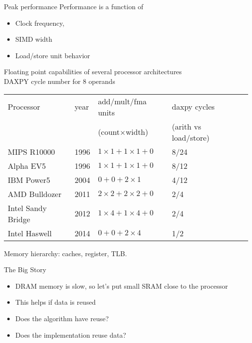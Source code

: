 \begin{numberedframe}{Peak performance}
\small
Performance is a function of
\begin{itemize}
\item Clock frequency,
\item SIMD width
\item Load/store unit behavior
\end{itemize}

Floating point capabilities of several processor architectures\\
 DAXPY cycle number for 8 operands  

  \begin{tabular}{lllll}
Processor&year&add/mult/fma units  &daxpy cycles\\
         &    &(count$\times$width)&(arith vs load/store)\\
\toprule
MIPS R10000       &1996 &$1\times1+1\times1+0$ &8/24 \\
Alpha EV5         &1996 &$1\times1+1\times1+0$ &8/12 \\
IBM Power5        &2004 &$0+0+2\times1       $ &4/12 \\
AMD Bulldozer     &2011 &$2\times2+2\times2+0$ &2/4  \\
Intel Sandy Bridge&2012 &$1\times4+1\times4+0$ &2/4  \\
Intel Haswell     &2014 &$0+0+2\times 4      $ &1/2  \\
  \end{tabular}
\end{numberedframe}

 {Memory hierarchy: caches, register, TLB.}

\begin{numberedframe}{The Big Story}
  \begin{itemize}
  \item DRAM memory is slow, so let's put small SRAM close to the processor
  \item This helps if data is reused 
  \item Does the algorithm have reuse?
  \item Does the implementation reuse data?
  \end{itemize}
\end{numberedframe}

